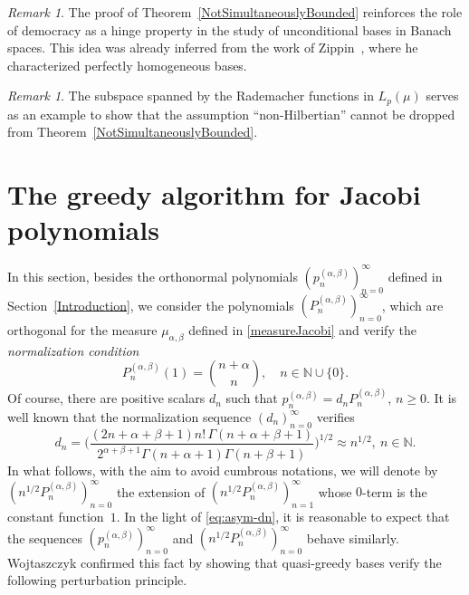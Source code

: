 \documentclass[11pt, leqno]{amsart}
\theoremstyle{remark}
\newtheorem{remark}[theorem]{Remark}
\numberwithin{equation}{section}
\newcommand{\NN}{\ensuremath{\mathbb{N}}}
\begin{document}
\begin{remark} 
The proof of Theorem~\ref{NotSimultaneouslyBounded}
reinforces the role of  democracy as a hinge property in the study of unconditional bases in Banach spaces. This idea was already inferred from the work of Zippin~\cite{Zippin1966}, where he characterized perfectly homogeneous bases.
\end{remark}


\begin{remark} 
The subspace spanned by the Rademacher functions in $L_{p}(\mu)$ serves as an example to show that the assumption
``non-Hilbertian'' cannot be dropped from
Theorem~\ref{NotSimultaneouslyBounded}.
\end{remark}

\section{The greedy algorithm for Jacobi polynomials}
\label{Jacobi}

In this section, besides the orthonormal polynomials $(p_n^{(\alpha,\beta)})_{n=0}^\infty$ defined in Section~\ref{Introduction}, we consider
the polynomials $(P_n^{(\alpha,\beta)})_{n=0}^\infty$, which are orthogonal for the measure 
$\mu_{\alpha,\beta}$ defined in \eqref{measureJacobi} and verify the \textit{normalization condition}
\begin{equation}
\label{ValueInOne}
P_n^{(\alpha,\beta)} (1)=\binom{n+\alpha}{n}, \quad n\in \NN\cup\{0\}.
\end{equation}
Of course, there are positive scalars $d_n$ such that $p_n^{(\alpha,\beta)}=d_n P_n^{(\alpha,\beta)}$, $n\ge 0$. It is well known that the normalization sequence 
$(d_n)_{n=0}^\infty $ verifies
\begin{equation}
\label{eq:asym-dn}
d_n
= \Big(\frac {(2n+\alpha+\beta+1)n!\,\Gamma(n+\alpha+\beta+1)}
{2^{\alpha+\beta+1}\Gamma(n+\alpha+1)\Gamma(n+\beta+1)}
 \Big)^{1/2}
\approx n^{1/2}, \ n\in\NN.
\end{equation}
In what follows, with the aim to avoid cumbrous notations, we will denote by $(n^{1/2} P_n^{(\alpha,\beta)})_{n=0}^\infty$ the extension of $(n^{1/2} P_n^{(\alpha,\beta)})_{n=1}^\infty$ whose $0$-term
is the constant function~$1$.
In the light of \eqref{eq:asym-dn},
it is reasonable to expect that the sequences $(p_n^{(\alpha,\beta)})_{n=0}^\infty$ and $(n^{1/2} P_n^{(\alpha,\beta)})_{n=0}^\infty$ behave similarly.
Wojtaszczyk \cite{Wo2000} confirmed this fact by showing that quasi-greedy bases verify the following perturbation principle. 
\end{document}
